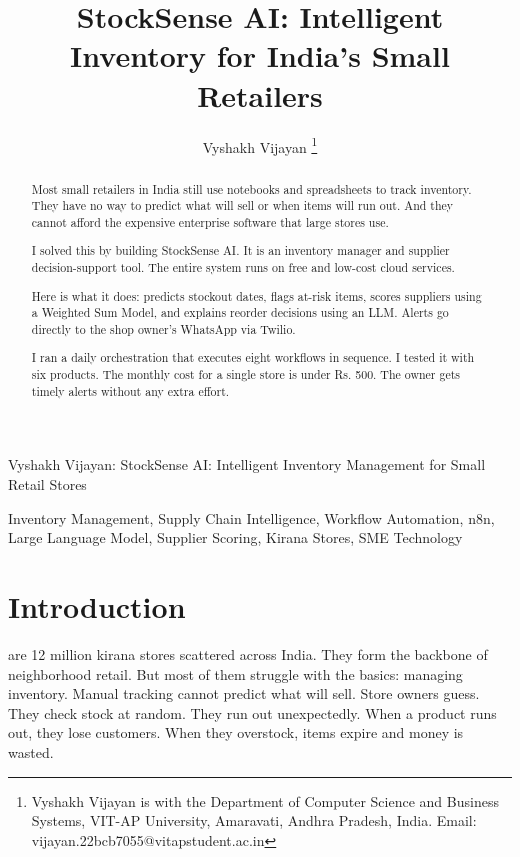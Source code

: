 \documentclass[journal]{IEEEtran}
\begin{document}
\title{StockSense AI: Intelligent Inventory for India's Small Retailers}

\author{Vyshakh Vijayan%
\thanks{Vyshakh Vijayan is with the Department of Computer Science and Business Systems, VIT-AP University, Amaravati, Andhra Pradesh, India. Email: vijayan.22bcb7055@vitapstudent.ac.in}%
}

%
{Vyshakh Vijayan: StockSense AI: Intelligent Inventory Management for Small Retail Stores}

\maketitle

\begin{abstract}
Most small retailers in India still use notebooks and spreadsheets to track inventory. They have no way to predict what will sell or when items will run out. And they cannot afford the expensive enterprise software that large stores use.

I solved this by building StockSense AI. It is an inventory manager and supplier decision-support tool. The entire system runs on free and low-cost cloud services.

Here is what it does: predicts stockout dates, flags at-risk items, scores suppliers using a Weighted Sum Model, and explains reorder decisions using an LLM. Alerts go directly to the shop owner's WhatsApp via Twilio.

I ran a daily orchestration that executes eight workflows in sequence. I tested it with six products. The monthly cost for a single store is under Rs. 500. The owner gets timely alerts without any extra effort.
\end{abstract}

\begin{IEEEkeywords}
Inventory Management, Supply Chain Intelligence, Workflow Automation, n8n, Large Language Model, Supplier Scoring, Kirana Stores, SME Technology
\end{IEEEkeywords}

\section{Introduction}
 are 12 million kirana stores scattered across India. They form the backbone of neighborhood retail. But most of them struggle with the basics: managing inventory. Manual tracking cannot predict what will sell. Store owners guess. They check stock at random. They run out unexpectedly. When a product runs out, they lose customers. When they overstock, items expire and money is wasted.
\end{document}
